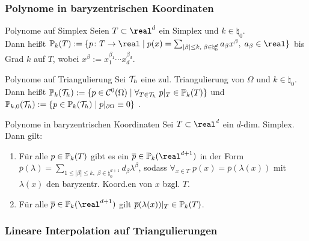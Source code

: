 \subsubsection{%
    Polynome in baryzentrischen Koordinaten%
}

\begin{Def}{Polynome auf Simplex}
    Seien $T \subset \real^d$ ein Simplex und $k \in \natural_0$.\\
    Dann heißt $\PP_k(T) := \{p\colon T \to \real \;|\;
    p(x) = \sum_{|\beta| \le k,\; \beta \in \natural_0^d} a_\beta x^\beta,\; a_\beta \in \real\}$
     bis Grad $k$ auf $T$,
    wobei $x^\beta := x_1^{\beta_1} \dotsm x_d^{\beta_d}$.
\end{Def}

\begin{Def}{Polynome auf Triangulierung}
    Sei $\mathcal{T}_h$ eine zul. Triangulierung von $\Omega$ und $k \in \natural_0$.\\
    Dann heißt
    $\mathbb{P}_k(\mathcal{T}_h) := \{p \in \mathcal{C}^0(\Omega) \;|\; \forall_{T \in \mathcal{T}_h}\; p|_T \in \mathbb{P}_k(T)\}$
     und
    $\mathbb{P}_{k,0}(\mathcal{T}_h) := \{p \in \mathbb{P}_k(\mathcal{T}_h) \;|\; p|_{\partial\Omega} \equiv 0\}$
    .
\end{Def}

\linie

\begin{Lemma}{Polynome in baryzentrischen Koordinaten}
    Sei $T \subset \real^d$ ein $d$-dim. Simplex.
    Dann gilt:
    \begin{enumerate}
        \item
        Für alle $p \in \mathbb{P}_k(T)$ gibt es ein $\overline{p} \in \PP_k(\real^{d+1})$
        in der Form $\overline{p}(\lambda) = \sum_{1 \le |\beta| \le k,\;
        \beta \in \natural_0^{d+1}} d_\beta \lambda^\beta$, sodass
        $\forall_{x \in T}\; p(x) = \overline{p}(\lambda(x))$ mit
        $\lambda(x)$ den baryzentr. Koord.en von $x$ bzgl. $T$.

        \item
        Für alle $\overline{p} \in \PP_k(\real^{d+1})$ gilt
        $\overline{p}(\lambda(x))|_T \in \mathbb{P}_k(T)$.
    \end{enumerate}
\end{Lemma}

\pagebreak

\subsubsection{%
    Lineare Interpolation auf Triangulierungen%
}

